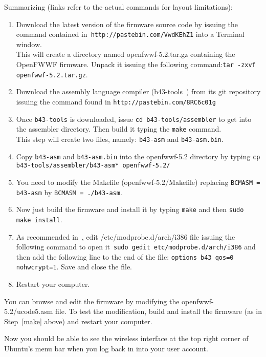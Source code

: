 \documentclass[conference]{IEEEtran}
\begin{document}
Summarizing (links refer to the actual commands for layout limitations):
\begin{enumerate}
	\item Download the latest version of the firmware source code by issuing the command contained in~\texttt{http://pastebin.com/VwdKEhZ1} into a Terminal window. \\ This will create a directory named  openfwwf-5.2.tar.gz containing the OpenFWWF firmware. Unpack it issuing the following command:\texttt{tar -zxvf openfwwf-5.2.tar.gz}.
	\item Download the assembly language compiler (b43-tools~\cite{b43-tools}) from its git repository issuing the command found in \texttt{http://pastebin.com/8RC6c01g}
	\item Once \texttt{b43-tools} is downloaded, issue \texttt{cd b43-tools/assembler} to get into the assembler directory. Then build it typing the \texttt{make} command.\\ This step will create two files, namely: \texttt{b43-asm} and \texttt{b43-asm.bin}.
	\item Copy \texttt{b43-asm} and \texttt{b43-asm.bin} into the openfwwf-5.2 directory by typing \texttt{cp b43-tools/assembler/b43-asm* openfwwf-5.2/}
	\item You need to modify the Makefile (openfwwf-5.2/Makefile) replacing \texttt{BCMASM = b43-asm} by \texttt{BCMASM = ./b43-asm}.
	\item Now just build the firmware and install it by typing \texttt{make} and then \texttt{sudo make install}.\label{make}
	\item As recommended in~\cite{OpenFWWF}, edit /etc/modprobe.d/arch/i386 file issuing the following command to open it~\texttt{sudo gedit etc/modprobe.d/arch/i386} and then add the following line to the end of the file: \texttt{options b43 qos=0 nohwcrypt=1}. Save and close the file.
	\item Restart your computer.
\end{enumerate}

You can browse and edit the firmware by modifying the openfwwf-5.2/ucode5.asm file. To test the modification, build and install the firmware (as in Step~\ref{make} above) and restart your computer.

Now you should be able to see the wireless interface at the top right corner of Ubuntu's menu bar when you log back in into your user account.



\end{document}
